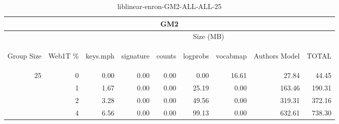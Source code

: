 \begin{center}
\begin{table}[htbp]
\begin{tabular}{ | r | r | r | r | r | r | r | r | r |}
\hline
\multicolumn{9}{|c|}{GM2}\\
\hline
 & & \multicolumn{7}{|c|}{Size (MB)}\\ \cline{3-9}
\begin{sideways}Group Size\end{sideways} & \begin{sideways}Web1T \% \end{sideways} & \begin{sideways}keys.mph\end{sideways} & \begin{sideways}signature\end{sideways} & \begin{sideways}counts\end{sideways} & \begin{sideways}logprobs\end{sideways} & \begin{sideways}vocabmap\end{sideways} & \begin{sideways}Authors Model \end{sideways} & \begin{sideways}TOTAL\end{sideways}\\
\hline
\multirow{3}{*}{25}
 & 0 & 0.00 & 0.00 & 0.00 & 0.00 & 16.61 & 27.84 & 44.45\\ \cline{2-9}
 & 1 & 1.67 & 0.00 & 0.00 & 25.19 & 0.00 & 163.46 & 190.31\\ \cline{2-9}
 & 2 & 3.28 & 0.00 & 0.00 & 49.56 & 0.00 & 319.31 & 372.16\\ \cline{2-9}
 & 4 & 6.56 & 0.00 & 0.00 & 99.13 & 0.00 & 632.61 & 738.30\\ \cline{2-9}
\hline
\end{tabular}
\caption{liblinear-enron-GM2-ALL-ALL-25}
\label{table:liblinear-enron-GM2-ALL-ALL-25}
\end{table}
\end{center}

